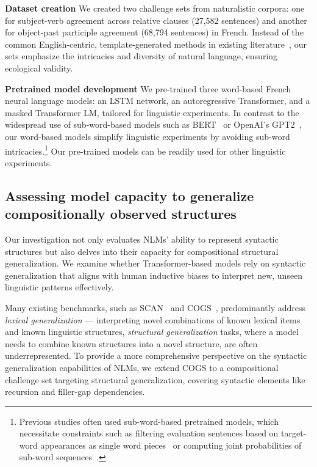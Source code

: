 \textbf{Dataset creation} We created two challenge sets from naturalistic corpora: one for subject-verb agreement across relative clauses (27,582 sentences) and another for object-past participle agreement (68,794 sentences) in French. Instead of the common English-centric, template-generated methods in existing literature~, our sets emphasize the intricacies and diversity of natural language, ensuring ecological validity.  

\textbf{Pretrained model development} We pre-trained three word-based French neural language models: an LSTM network, an autoregressive Transformer, and a masked Transformer LM, tailored for linguistic experiments.  In contrast to the widespread use of sub-word-based models such as BERT~\citep{devlin-etal-2019-bert} or OpenAI's GPT2~\citep{radford2019language}, our word-based models simplify linguistic experiments by avoiding sub-word intricacies.\footnote{Previous studies often used sub-word-based pretrained models, which necessitate constraints such as filtering evaluation sentences based on target-word appearances as single word pieces~\citep{goldberg19assessing} or computing joint probabilities of sub-word sequences~\citep{wolf2019some}.} Our pre-trained models can be readily used for other linguistic experiments.


\subsection{Assessing model capacity to generalize compositionally observed structures }

Our investigation not only evaluates NLMs' ability to represent syntactic structures but also delves into their capacity for compositional structural generalization. We examine whether Transformer-based models rely on syntactic generalization that aligns with human inductive biases to interpret new, unseen linguistic patterns effectively.

Many existing benchmarks, such as SCAN~\citep{lake2018generalization} and COGS~\citep{kim-linzen-2020-cogs}, predominantly address \textit{lexical generalization} --- interpreting novel combinations of known lexical items and known linguistic structures, \textit{structural generalization} tasks, where a model needs to combine known structures into a novel structure, are often underrepresented. To provide a more comprehensive perspective on the syntactic generalization capabilities of NLMs, we extend COGS to a compositional challenge set targeting structural generalization, covering syntactic elements like recursion and filler-gap dependencies.

